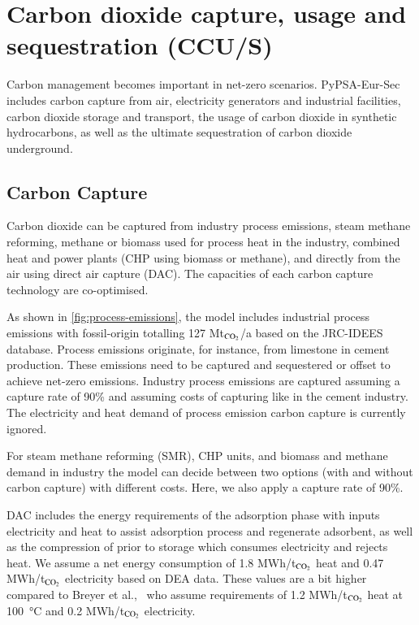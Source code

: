 \section{Carbon dioxide capture, usage and sequestration (CCU/S)}
\label{sec:si:carbon-management}

Carbon management becomes important in net-zero scenarios.
 PyPSA-Eur-Sec includes carbon capture
from air, electricity generators and industrial facilities, carbon dioxide
storage and transport, the usage of carbon dioxide in synthetic hydrocarbons, as
well as the ultimate sequestration of carbon dioxide underground.

\subsection{Carbon Capture}

Carbon dioxide can be captured from industry process emissions, steam methane
reforming, methane or biomass used for process heat in the industry, combined
heat and power plants (CHP using biomass or methane), and directly from the air
using direct air capture (DAC). The capacities of each carbon capture technology
are co-optimised.

As shown in \cref{fig:process-emissions}, the model includes industrial process
emissions with fossil-origin totalling 127 Mt$_{\ce{CO2}}$/a based on
the JRC-IDEES database. Process emissions originate, for instance,
from limestone in cement production. These emissions need to be captured and
sequestered or offset to achieve net-zero emissions. Industry process emissions
are captured assuming a capture rate of 90\% and assuming costs of \co capturing
like in the cement industry. The electricity and heat demand of process
emission carbon capture is currently ignored.

For steam methane reforming (SMR), CHP units, and biomass and methane demand in
industry the model can decide between two options (with and without carbon
capture) with different costs. Here, we also apply a capture rate of 90\%.

DAC includes the energy requirements of the adsorption phase with inputs
electricity and heat to assist adsorption process and regenerate adsorbent, as
well as the compression of \co prior to storage which consumes electricity and
rejects heat. We assume a net energy consumption of 1.8 MWh/t$_{\ce{CO2}}$ heat and 0.47
MWh/t$_{\ce{CO2}}$ electricity based on DEA data. These values are a bit higher
compared to Breyer et al.,~ who assume
requirements of 1.2 MWh/t$_{\ce{CO2}}$ heat at \SI{100}{\celsius} and 0.2 MWh\el/t$_{\ce{CO2}}$
electricity.

